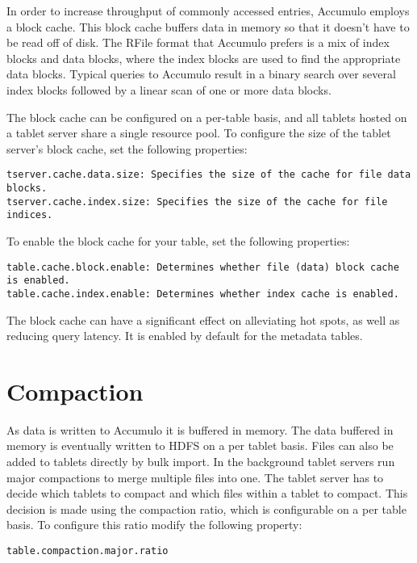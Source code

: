 In order to increase throughput of commonly accessed entries, Accumulo employs a block cache.
This block cache buffers data in memory so that it doesn't have to be read off of disk.
The RFile format that Accumulo prefers is a mix of index blocks and data blocks, where the index blocks are used to find the appropriate data blocks.
Typical queries to Accumulo result in a binary search over several index blocks followed by a linear scan of one or more data blocks.

The block cache can be configured on a per-table basis, and all tablets hosted on a tablet server share a single resource pool.
To configure the size of the tablet server's block cache, set the following properties:

\begingroup\fontsize{8pt}{8pt}\selectfont\begin{verbatim}
tserver.cache.data.size: Specifies the size of the cache for file data blocks.
tserver.cache.index.size: Specifies the size of the cache for file indices.
\end{verbatim}\endgroup

To enable the block cache for your table, set the following properties:

\begingroup\fontsize{8pt}{8pt}\selectfont\begin{verbatim}
table.cache.block.enable: Determines whether file (data) block cache is enabled.
table.cache.index.enable: Determines whether index cache is enabled.
\end{verbatim}\endgroup

The block cache can have a significant effect on alleviating hot spots, as well as reducing query latency.
It is enabled by default for the metadata tables.

\section{Compaction}

As data is written to Accumulo it is buffered in memory. The data buffered in
memory is eventually written to HDFS on a per tablet basis. Files can also be
added to tablets directly by bulk import. In the background tablet servers run
major compactions to merge multiple files into one. The tablet server has to
decide which tablets to compact and which files within a tablet to compact.
This decision is made using the compaction ratio, which is configurable on a
per table basis. To configure this ratio modify the following property:

\begingroup\fontsize{8pt}{8pt}\selectfont\begin{verbatim}
table.compaction.major.ratio
\end{verbatim}\endgroup

